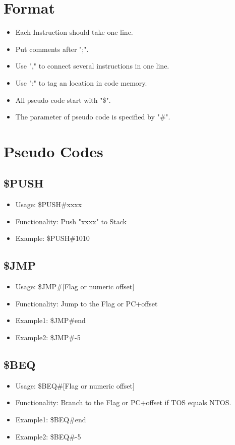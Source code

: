 \documentclass[11pt]{report}
\begin{document}
    \section{Format}
    \begin{itemize}
        \item Each Instruction should take one line.
        \item Put comments after ";".
        \item Use "," to connect several instructions in one line.
        \item Use ":" to tag an location in code memory.
        \item All pseudo code start with "\$".
        \item The parameter of pseudo code is specified by "\#".
    \end{itemize}
    
    \section{Pseudo Codes}
    \subsection{\$PUSH}
    \begin{itemize}
        \item Usage: \$PUSH\#xxxx
        \item Functionality: Push "xxxx" to Stack
        \item Example: \$PUSH\#1010
    \end{itemize}
    \subsection{\$JMP}
    \begin{itemize}
        \item Usage: \$JMP\#[Flag or numeric offset]
        \item Functionality: Jump to the Flag or PC+offset
        \item Example1: \$JMP\#end
        \item Example2: \$JMP\#-5
    \end{itemize}
    \subsection{\$BEQ}
    \begin{itemize}
        \item Usage: \$BEQ\#[Flag or numeric offset]
        \item Functionality: Branch to the Flag or PC+offset if TOS equals NTOS.
        \item Example1: \$BEQ\#end
        \item Example2: \$BEQ\#-5
    \end{itemize}
\end{document}
